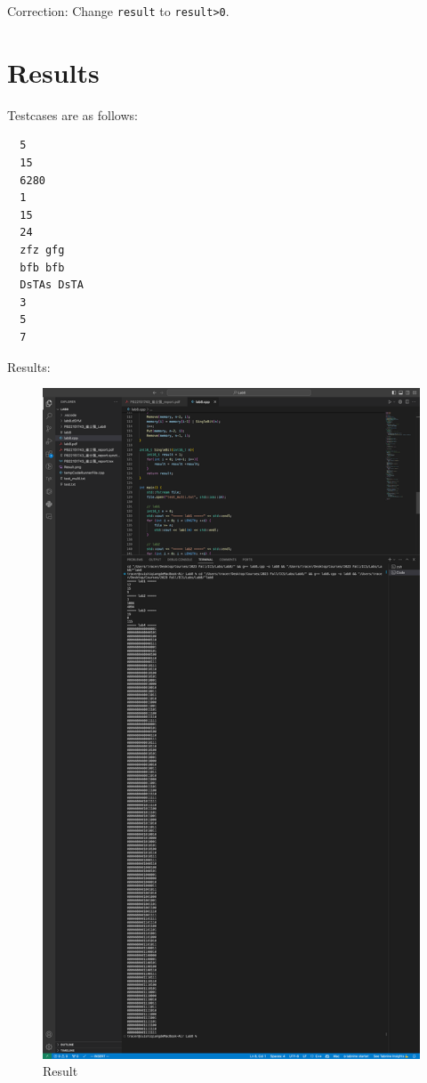 \documentclass[UTF8]{ctexart}
\begin{document}
Correction: Change \lstinline{result} to \lstinline{result>0}.

\section{Results}
Testcases are as follows:
\begin{lstlisting}
  5
  15
  6280
  1
  15
  24
  zfz gfg
  bfb bfb
  DsTAs DsTA
  3
  5
  7
\end{lstlisting}
\clearpage
Results: 
\begin{figure}[H]
  \centering
  \includegraphics[scale=0.23]{Result.png}
  \caption{Result}
\end{figure}


\end{document}
